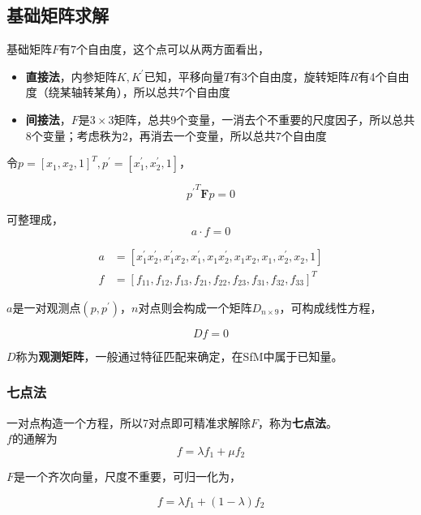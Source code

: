 	\subsection*{基础矩阵求解}
		基础矩阵$F$有$7$个自由度，这个点可以从两方面看出，
		\begin{itemize}
			\item \textbf{直接法}，内参矩阵$K,K^\prime$已知，平移向量$T$有3个自由度，旋转矩阵$R$有4个自由度（绕某轴转某角），所以总共7个自由度
			\item \textbf{间接法}，$F$是$3\times 3$矩阵，总共9个变量，一消去个不重要的尺度因子，所以总共8个变量；考虑秩为2，再消去一个变量，所以总共7个自由度
		\end{itemize}

		令$p=[x_1,x_2,1]^T,p^\prime = [x_1^\prime,x_2^\prime,1]$，

		\begin{equation}
			{p^{\prime}}^T \mathbf{F} p = 0
		\end{equation}

		可整理成，
		$$
			a\cdot f = 0
		$$

		\begin{align*}
			a &= [x_1^\prime x_2^\prime,x_1^\prime x_2,x_1^\prime, x_1x_2^\prime,x_1x_2,x_1,x_2^\prime,x_2,1]\\
			f &= [f_{11},f_{12},f_{13},f_{21},f_{22},f_{23},f_{31},f_{32},f_{33}]^T
		\end{align*}

		$a$是一对观测点$(p,p^\prime)$，$n$对点则会构成一个矩阵$D_{n \times 9}$，可构成线性方程，

		\begin{equation}\label{f_matrix_eq}
			Df = 0
		\end{equation}

		$D$称为\textbf{观测矩阵}，一般通过特征匹配来确定，在SfM中属于已知量。\\

	\subsubsection*{七点法}

		一对点构造一个方程，所以7对点即可精准求解除$F$，称为\textbf{七点法}。\\

		$f$的通解为
		$$
			f = \lambda f_1 + \mu f_2
		$$

		$F$是一个齐次向量，尺度不重要，可归一化为，
		
		$$
			f = \lambda f_1 + (1-\lambda) f_2
		$$

